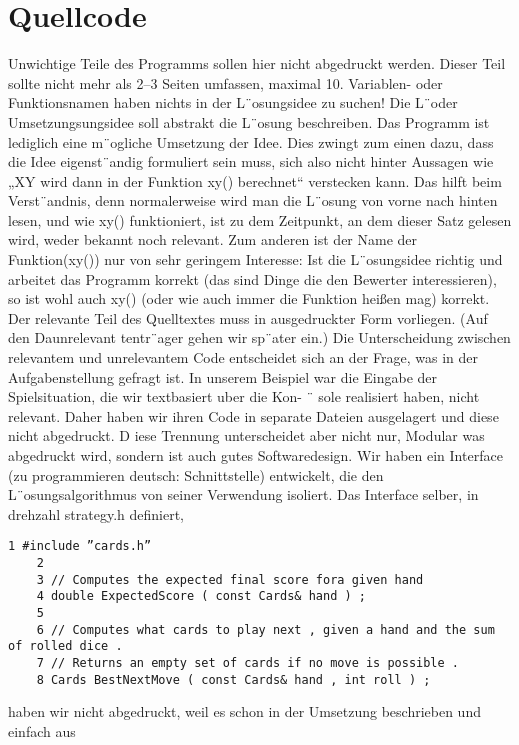 \documentclass[a4paper,10pt,ngerman]{scrartcl}
\begin{document}
    \section{Quellcode}\label{sec:quellcode}
    Unwichtige Teile des Programms sollen hier nicht abgedruckt werden.
    Dieser Teil sollte nicht mehr als 2–3 Seiten umfassen, maximal 10.
    Variablen- oder Funktionsnamen haben nichts in der L¨osungsidee zu suchen!
    Die L¨oder Umsetzungsungsidee soll abstrakt die L¨osung beschreiben.
    Das Programm ist lediglich eine m¨ogliche Umsetzung der Idee.
    Dies zwingt zum einen dazu, dass die Idee eigenst¨andig formuliert sein muss, sich also
    nicht hinter Aussagen wie „XY wird dann in der Funktion xy() berechnet“ verstecken kann.
    Das hilft beim Verst¨andnis, denn normalerweise wird man die L¨osung von vorne
    nach hinten lesen, und wie xy() funktioniert, ist zu dem Zeitpunkt, an dem dieser Satz
    gelesen wird, weder bekannt noch relevant.
    Zum anderen ist der Name der Funktion(xy()) nur von sehr geringem Interesse:
    Ist die L¨osungsidee richtig und arbeitet das Programm korrekt (das sind Dinge die den Bewerter interessieren),
    so ist wohl auch xy() (oder wie auch immer die Funktion heißen mag) korrekt.
    Der relevante Teil des Quelltextes muss in ausgedruckter Form vorliegen. (Auf den Daunrelevant tentr¨ager gehen wir sp¨ater ein.) Die Unterscheidung zwischen relevantem und unrelevantem Code entscheidet sich an der Frage, was in der Aufgabenstellung gefragt ist. In
    unserem Beispiel war die Eingabe der Spielsituation, die wir textbasiert uber die Kon- ¨
    sole realisiert haben, nicht relevant.
    Daher haben wir ihren Code in separate Dateien
    ausgelagert und diese nicht abgedruckt. D
    iese Trennung unterscheidet aber nicht nur,
    Modular was abgedruckt wird, sondern ist auch gutes Softwaredesign.
    Wir haben ein Interface (zu
    programmieren deutsch: Schnittstelle) entwickelt, die den L¨osungsalgorithmus von seiner Verwendung
    isoliert.
    Das Interface selber, in drehzahl strategy.h definiert,
    \begin{lstlisting}[label={lst:lstlisting}]
    1 #include ”cards.h”
    2
    3 // Computes the expected final score fora given hand
    4 double ExpectedScore ( const Cards& hand ) ;
    5
    6 // Computes what cards to play next , given a hand and the sum of rolled dice .
    7 // Returns an empty set of cards if no move is possible .
    8 Cards BestNextMove ( const Cards& hand , int roll ) ;
    \end{lstlisting}
    haben wir nicht abgedruckt, weil es schon in der Umsetzung beschrieben und einfach aus
\end{document}
